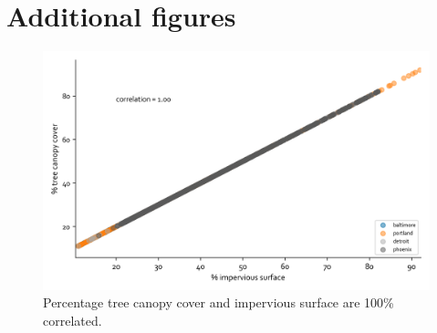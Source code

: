 \documentclass[final,3p,times,twocolumn,sort&compress]{elsarticle}
\begin{document}
\section{Additional figures}
\begin{figure}[h]
    \centering
    \includegraphics[width=\linewidth]{fig/report/imp_v_tree_500.png}
    \caption{
    Percentage tree canopy cover and impervious surface are 100\% correlated.
    }
    \label{fig:imp_tree}
\end{figure}
\end{document}

